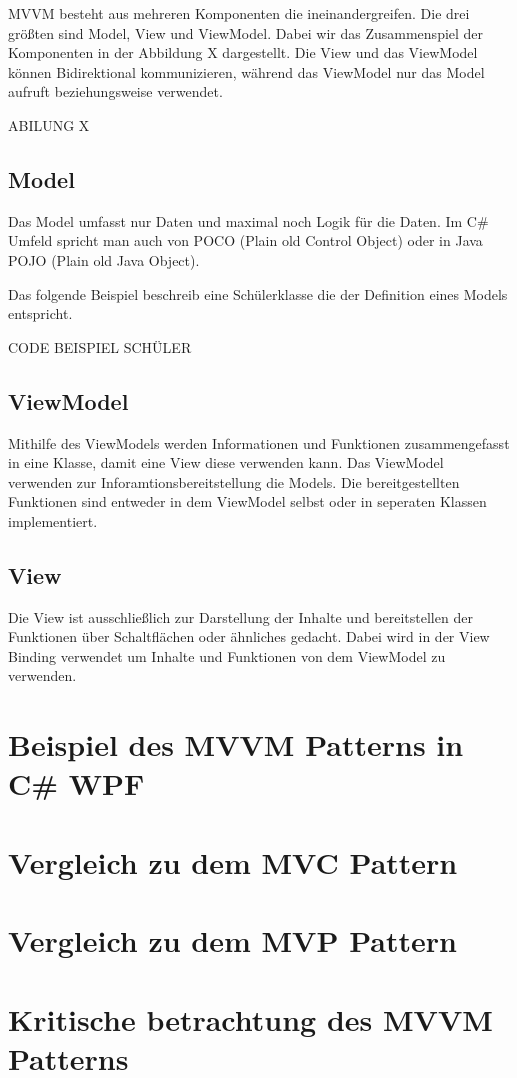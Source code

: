 \documentclass[titlepage=false,12pt]{scrreprt}
\begin{document}
	MVVM besteht aus mehreren Komponenten die ineinandergreifen. Die drei 
	größten sind Model, View und ViewModel. Dabei wir das Zusammenspiel 
	der Komponenten in der Abbildung X dargestellt. Die View und das ViewModel 
	können Bidirektional kommunizieren, während das ViewModel nur das Model
	aufruft beziehungsweise verwendet.

	ABILUNG X

	\section{Model}

	Das Model umfasst nur Daten und maximal noch Logik für die Daten. 
	Im C\# Umfeld spricht man auch von POCO (Plain old Control Object) 
	oder in Java POJO (Plain old Java Object).
	
	Das folgende Beispiel beschreib eine Schülerklasse die der Definition 
	eines Models entspricht.

	CODE BEISPIEL SCHÜLER

	\section{ViewModel}

	Mithilfe des ViewModels werden Informationen und Funktionen zusammengefasst
	in eine Klasse, damit eine View diese verwenden kann. Das ViewModel verwenden zur 
	Inforamtionsbereitstellung die Models. Die bereitgestellten Funktionen sind
	entweder in dem ViewModel selbst oder in seperaten Klassen implementiert.

	\section{View}

	Die View ist ausschließlich zur Darstellung der Inhalte und bereitstellen der
	Funktionen über Schaltflächen oder ähnliches gedacht. Dabei wird in der View
	Binding verwendet um Inhalte und Funktionen von dem ViewModel zu verwenden.

	\chapter{Beispiel des MVVM Patterns in C\# WPF}


	\chapter{Vergleich zu dem MVC Pattern}


	\chapter{Vergleich zu dem MVP Pattern}


	\chapter{Kritische betrachtung des MVVM Patterns}
\end{document}

